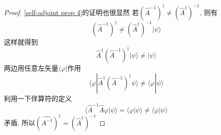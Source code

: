 \documentclass[a4paper,11pt]{book}
\newtheorem{proof}{证明}[section]
\begin{document}
\begin{proof}
  \ref{self-adjoint prop 4}的证明也很显然
  若$(\hat{A}^{-1})^\dag\neq(\hat{A}^\dag)^{-1}$, 则有
  \begin{equation*}
    (\hat{A}^{-1})^\dag\neq(\hat{A}^\dag)^{-1}|\psi\rangle
  \end{equation*}
  这样就得到
  \begin{equation*}
    \hat{A}^\dag(\hat{A}^{-1})^\dag|\psi\rangle\neq|\psi\rangle
  \end{equation*}
  两边用任意左矢量$\langle\varphi|$作用
  \begin{equation*}
    \langle\varphi|\hat{A}^\dag(\hat{A}^{-1})^\dag\psi\rangle\neq\langle\varphi|\psi\rangle
  \end{equation*}
  利用一下伴算符的定义
  \begin{equation*}
    \langle\hat{A}^{-1}\hat{A}\varphi|\psi\rangle=\langle\varphi|\psi\rangle\neq\langle\varphi|\psi\rangle
  \end{equation*}
  矛盾. 所以$(\hat{A^{-1}})^\dag=(\hat{A}^\dag)^{-1}$
\end{proof}
\end{document}
